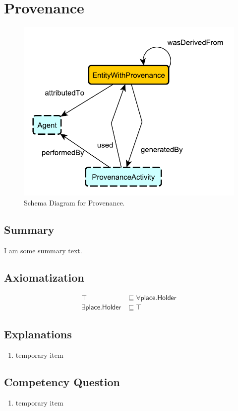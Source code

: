 \section{Provenance}
\label{sec:Provenance}
\begin{figure}[h!]
\begin{center}
\includegraphics[width=.4\textwidth]{figures/provenance}
\end{center}
\caption{Schema Diagram for Provenance.}
\label{fig:Provenance}
\end{figure}
\subsection{Summary}
\label{sum:Provenance}
I am some summary text.

\subsection{Axiomatization}
\label{axs:Provenance}
\begin{align}
\top &\sqsubseteq \forall\textsf{place.Holder} \\ 
\exists\textsf{place.Holder} &\sqsubseteq \top 
\end{align}

\subsection{Explanations}
\label{exp:Provenance}
\begin{enumerate}
\item temporary item
\end{enumerate}

\subsection{Competency Question}
\label{cqs:Provenance}
\begin{enumerate}[CQ1.]
\item temporary item
\end{enumerate}

\newpage
